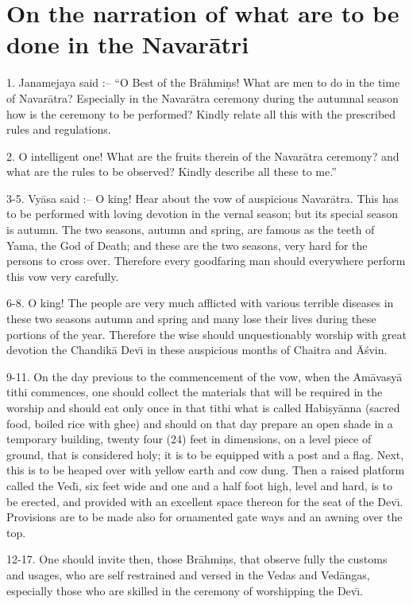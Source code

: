 \chapter{On the narration of what are to be done in the Navar\=atri}

1. Janamejaya said :-- ``O Best of the Br\=ahmi\d{n}s! What are men to do in the time of Navar\=atra? Especially in the Navar\=atra ceremony during the autumnal season how is the ceremony to be performed? Kindly relate all this with the prescribed rules and regulations.

2. O intelligent one! What are the fruits therein of the Navar\=atra ceremony? and what are the rules to be observed? Kindly describe all these to me.''

3-5. Vy\=asa said :-- O king! Hear about the vow of auspicious Navar\=atra. This has to be performed with loving devotion in the vernal season; but its special season is autumn. The two seasons, autumn and spring, are famous as the teeth of Yama, the God of Death; and these are the two seasons, very hard for the persons to cross over. Therefore every goodfaring man should everywhere perform this vow very carefully.

6-8. O king! The people are very much afflicted with various terrible diseases in these two seasons autumn and spring and many lose their lives during these portions of the year. Therefore the wise should unquestionably worship with great devotion the Chandik\=a Dev\={\i} in these auspicious months of Chaitra and \=A\'svin.

9-11. On the day previous to the commencement of the vow, when the Am\=avasy\=a tithi commences, one should collect the materials that will be required in the worship and should eat only once in that tithi what is called Habi\d{s}y\=anna (sacred food, boiled rice with ghee) and should on that day prepare an open shade in a temporary building, twenty four (24) feet in dimensions, on a level piece of ground, that is considered holy; it is to be equipped with a post and a flag. Next, this is to be heaped over with yellow earth and cow dung. Then a raised platform called the Ved\={\i}, six feet wide and one and a half foot high, level and hard, is to be erected, and provided with an excellent space thereon for the seat of the Dev\={\i}. Provisions are to be made also for ornamented gate ways and an awning over the top.

12-17. One should invite then, those Br\=ahmi\d{n}s, that observe fully the customs and usages, who are self restrained and versed in the Vedas and Ved\=angas, especially those who are skilled in the ceremony of worshipping the Dev\={\i}.

